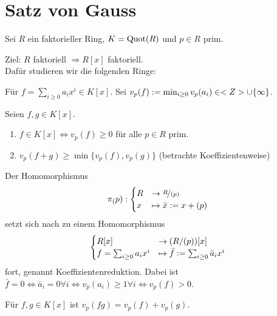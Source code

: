 \section{Satz von Gauss}

Sei $R$ ein faktorieller Ring, $K= \operatorname{Quot}(R)$ und $p \in R$ prim.

\begin{remark}
	Ziel: $R$ faktoriell $\Rightarrow R[x]$ faktoriell.\\
	Dafür studieren wir die folgenden Ringe:
\end{remark}

\begin{definition}
	Für $f = \sum_{i \ge 0} a_i x^i \in K[x]$. Sei $v_p(f) := \min_{i \ge 0} v_p(a_i) \in <Z> \cup \{\infty\}$.
\end{definition}

\begin{remark}
	Seien $f,g \in K[x]$.
	\begin{enumerate}
		\item $f \in K[x] \Leftrightarrow v_p(f) \ge 0$ für alle $p \in R$ prim.
		\item $v_p(f+g) \ge \min\{v_p(f), v_p(g)\}$ (betrachte Koeffizientenweise)
	\end{enumerate}
\end{remark}

\begin{definition}
	Der Homomorphismus
	\begin{align}
	\pi_(p): \begin{cases}
	R &\to \lnkset{R}{(p)} \\
	x &\mapsto \bar{x} := x + (p)
	\end{cases}\notag
	\end{align}
	setzt sich nach  zu einem Homomorphismus
	\begin{align}
	\begin{cases}
		R[x] &\to (R/(p))[x]\\
		f=\sum_{i \ge 0} a_i x^i &\mapsto \bar{f} := \sum_{i \ge 0} \bar{a}_i x^i
	\end{cases}\notag
	\end{align}
	fort, genannt Koeffizientenreduktion. Dabei ist $\bar{f} = 0 \Leftrightarrow \bar{a}_i = 0 \forall i \Leftrightarrow v_p(a_i) \ge 1 \forall i \Leftrightarrow v_p(f) > 0$.
\end{definition}

\begin{proposition}
	Für $f,g \in K[x]$ ist $v_p(fg) = v_p(f)+v_p(g)$.
\end{proposition}

